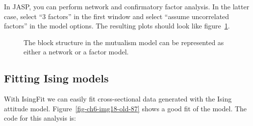 \documentclass[
  a4paper,
  DIV=11,
  numbers=noendperiod,
  oneside]{scrreprt}
\begin{document}
In JASP, you can perform network and confirmatory factor analysis. In
the latter case, select ``3 factors'' in the first window and select
``assume uncorrelated factors'' in the model options. The resulting
plots should look like figure~\ref{fig-ch6-img17-old-86}.

\begin{figure}


\caption{\label{fig-ch6-img17-old-86}The block structure in the
mutualism model can be represented as either a network or a factor
model.}

\end{figure}%

\subsection{Fitting Ising models}\label{sec-Fitting-Ising-models}

With IsingFit we can easily fit cross-sectional data generated with the
Ising attitude model. Figure~\ref{fig-ch6-img18-old-87} shows a good fit
of the model. The code for this analysis is:
\end{document}
